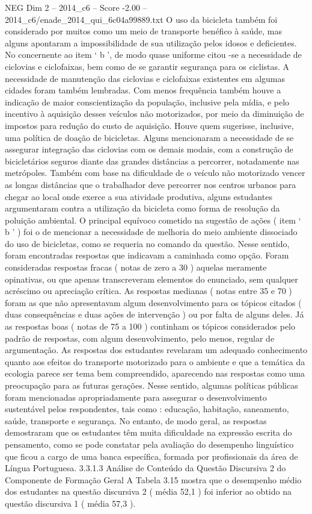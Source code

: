 \begin{textsample}{NEG Dim 2 – 2014\_c6 – Score -2.00 – 2014\_c6/enade\_2014\_qui\_6c04a99889.txt}
O uso da bicicleta também foi considerado por muitos como um meio de transporte benéfico à saúde, mas alguns apontaram a impossibilidade de sua utilização pelos idosos e deficientes.
No concernente ao item ‘ b ’, de modo quase uniforme citou -se a necessidade de ciclovias e ciclofaixas, bem como de se garantir segurança para os ciclistas.
A necessidade de manutenção das ciclovias e ciclofaixas existentes em algumas cidades foram também lembradas.
Com menos frequência também houve a indicação de maior conscientização da população, inclusive pela mídia, e pelo incentivo à aquisição desses veículos não motorizados, por meio da diminuição de impostos para redução do custo de aquisição.
Houve quem sugerisse, inclusive, uma política de doação de bicicletas.
Alguns mencionaram a necessidade de se assegurar integração das ciclovias com os demais modais, com a construção de bicicletários seguros diante das grandes distâncias a percorrer, notadamente nas metrópoles.
Também com base na dificuldade de o veículo não motorizado vencer as longas distâncias que o trabalhador deve percorrer nos centros urbanos para chegar ao local onde exerce a sua atividade produtiva, alguns estudantes argumentaram contra a utilização da bicicleta como forma de resolução da poluição ambiental.
O principal equívoco cometido na sugestão de ações ( item ‘ b ’ ) foi o de mencionar a necessidade de melhoria do meio ambiente dissociado do uso de bicicletas, como se requeria no comando da questão.
Nesse sentido, foram encontradas respostas que indicavam a caminhada como opção.
Foram consideradas respostas fracas ( notas de zero a 30 ) aquelas meramente opinativas, ou que apenas transcreveram elementos do enunciado, sem qualquer acréscimo ou apreciação crítica.
As respostas medianas ( notas entre 35 e 70 ) foram as que não apresentavam algum desenvolvimento para os tópicos citados ( duas consequências e duas ações de intervenção ) ou por falta de alguns deles.
Já as respostas boas ( notas de 75 a 100 ) continham os tópicos considerados pelo padrão de respostas, com algum desenvolvimento, pelo menos, regular de argumentação.
As respostas dos estudantes revelaram um adequado conhecimento quanto aos efeitos do transporte motorizado para o ambiente e que a temática da ecologia parece ser tema bem compreendido, aparecendo nas respostas como uma preocupação para as futuras gerações.
Nesse sentido, algumas políticas públicas foram mencionadas apropriadamente para assegurar o desenvolvimento sustentável pelos respondentes, tais como : educação, habitação, saneamento, saúde, transporte e segurança.
No entanto, de modo geral, as respostas demostraram que os estudantes têm muita dificuldade na expressão escrita do pensamento, como se pode constatar pela avaliação do desempenho linguístico que ficou a cargo de uma banca específica, formada por profissionais da área de Língua Portuguesa. 3.3.1.3 Análise de Conteúdo da Questão Discursiva 2 do Componente de Formação Geral A Tabela 3.15 mostra que o desempenho médio dos estudantes na questão discursiva 2 ( média 52,1 ) foi inferior ao obtido na questão discursiva 1 ( média 57,3 ).

\end{textsample}
